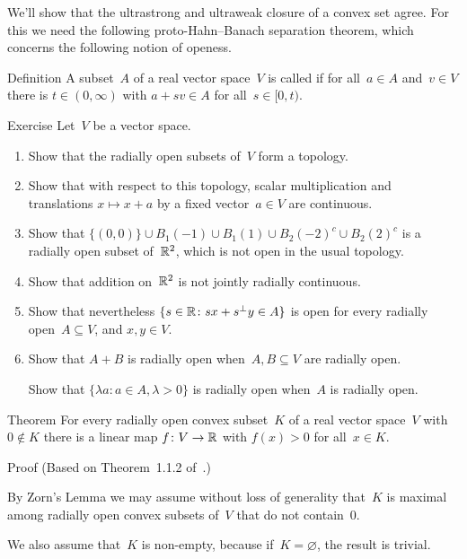 \documentclass[a]{subfiles}
\begin{document}
\begin{parsec}%
\begin{point}%
We'll show that the ultrastrong and ultraweak closure
of a convex set agree. 
For this we need the following proto-Hahn--Banach separation theorem,
which concerns the following notion of openess.
\end{point}
\begin{point}{Definition}%
A subset~$A$ of a real vector space~$V$ 
is called 
if for all~$a\in A$ and~$v\in V$
there is $t\in (0,\infty)$
with $a+sv\in A$ for all~$s\in [0,t)$.
\end{point}
\begin{point}{Exercise}%
Let~$V$ be a vector space.
\begin{enumerate}
\item
Show that the radially open subsets of~$V$ form a topology.
\item
Show that with respect to this topology,
scalar multiplication and translations $x\mapsto x+a$
by a fixed vector~$a\in V$ are continuous.
\item
Show that $\{(0,0)\}\cup B_1(-1)\cup B_1(1)\cup B_2(-2)^c\cup B_2(2)^c$
is a radially open subset of~$\mathbb{R}^2$, 
which is not open
in the usual topology.

\item
Show that addition on~$\mathbb{R}^2$ is not jointly radially continuous.
\item
Show that nevertheless $\{s\in \mathbb{R} \colon sx+s^\perp y\in A\}$
is open for every radially open~$A\subseteq V$, and $x,y\in V$.
\item
Show that $A+B$ is radially open when~$A,B\subseteq V$ are radially open.

Show that $\{\lambda a\colon a\in A,\lambda>0\}$ is radially open
when~$A$ is radially open.
\end{enumerate}
\end{point}
\begin{point}{Theorem}%
For every radially open
convex subset~$K$ of a real vector space~$V$
with~$0\notin K$
there is a linear map $f\colon V\to\mathbb{R}$
with $f(x)>0$ for all~$x\in K$.
\begin{point}{Proof}%
(Based on Theorem~1.1.2 of~\cite{kr}.)

By Zorn's Lemma we may assume without loss of generality that~$K$ is maximal
among radially open convex subsets of~$V$ that do not contain~$0$.

We also assume that~$K$ is non-empty,
because if~$K=\varnothing$, the result is trivial.


\end{point}
\end{point}
\end{parsec}
\end{document}
